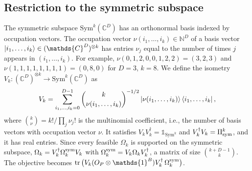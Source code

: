 \documentclass[aps,pra,twocolumn,showpacs,superscriptaddress,groupedaddress]{revtex4-2}
\newcommand{\one}[0]{\mathds{1}}
\newcommand{\N}{\mathds{N}}
\newcommand{\C}{\mathds{C}}
\newcommand{\I}{\one}
\begin{document}
\begin{widetext}
\subsection{Restriction to the symmetric subspace}
The symmetric subspace $\text{Sym}^k(\C^D)$ has an orthonormal basis indexed by occupation vectors. The occupation vector $\nu(i_1,\dots,i_k)\in\N^D$ of a basis vector $\ket{i_1,\dots,i_k}\in(\C^D)^{\otimes k}$ has entries $\nu_j$ equal to the number of times $j$ appears in $(i_1,\dots,i_k)$. For example, $\nu(0,1,2,0,0,1,2,2)=(3,2,3)$ and $\nu(1,1,1,1,1,1,1,1)=(0,8,0)$ for $D=3$, $k=8$. We define the isometry $V_k:(\C^D)^{\otimes k}\to\text{Sym}^k(\C^D)$ as
\begin{equation}
    V_k = \sum_{i_1, \dots, i_k=0}^{D-1} \binom{k}{\nu(i_1, \dots, i_k)}^{-1/2}\ket{\nu(i_1, \dots, i_k)}\bra{i_1, \dots, i_k},
\end{equation}
where $\binom{k}{\nu}=k!/\prod_j\nu_j!$ is the multinomial coefficient, i.e., the number of basis vectors with occupation vector $\nu$. It satisfies $V_kV_k^\dagger=\I_{\text{Sym}^k}$ and $V_k^\dagger V_k=\Pi_{\rm sym}^{k}$, and it has real entries. Since every feasible $\Omega_k$ is supported on the symmetric subspace, $\Omega_k=V_k^\dagger\Omega_k^{\rm sym}V_k$ with $\Omega_k^{\rm sym}=V_k\Omega_kV_k^\dagger$, a matrix of size $\binom{k+D-1}{k}$. The objective becomes $\tr\big(V_k(O_P\otimes\I^B)V_k^\dagger\,\Omega_k^{\rm sym}\big)$.


\end{widetext}
\end{document}
